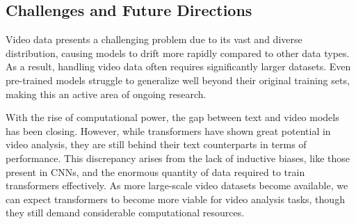 \subsection{Challenges and Future Directions}

Video data presents a challenging problem due to its vast and diverse distribution, causing models to drift more rapidly compared to other data types. As a result, handling video data often requires significantly larger datasets. Even pre-trained models struggle to generalize well beyond their original training sets, making this an active area of ongoing research.

With the rise of computational power, the gap between text and video models has been closing. However, while transformers have shown great potential in video analysis, they are still behind their text counterparts in terms of performance. This discrepancy arises from the lack of inductive biases, like those present in CNNs, and the enormous quantity of data required to train transformers effectively. As more large-scale video datasets become available, we can expect transformers to become more viable for video analysis tasks, though they still demand considerable computational resources.